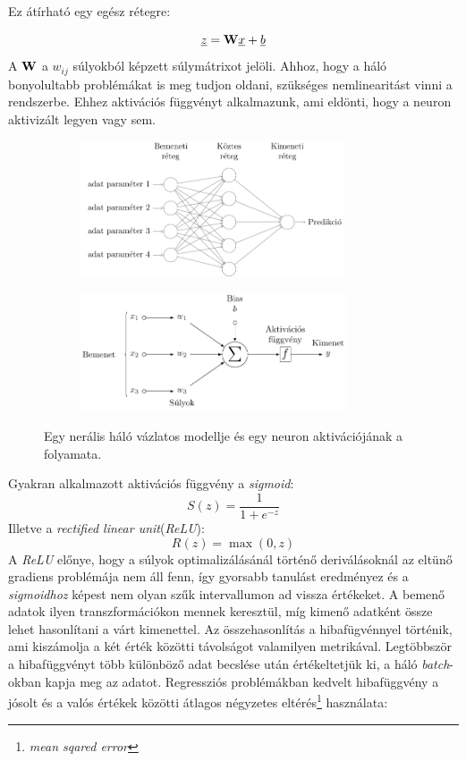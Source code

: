 \documentclass[12pt,letterpaper,oneside,openright]{book}
\begin{document}
Ez átírható egy egész rétegre:

\begin{equation}
\underline{z} = \bold{W}\underline x +\underline{b}
\end{equation}
A $\bold{W}$ a $w_{ij}$ súlyokból képzett súlymátrixot jelöli. Ahhoz, hogy a háló bonyolultabb problémákat is meg tudjon oldani, szükséges nemlinearitást vinni a rendszerbe. Ehhez  aktivációs függvényt alkalmazunk, ami eldönti, hogy a neuron aktivizált legyen vagy sem.  
\begin{figure}[h!]
\centering
\hspace{-2.8 cm}
\begin{subfigure}[b]{0.3\textwidth}
\includegraphics[height=40mm]{Figures/fig1.pdf}
\end{subfigure}\hspace{3.5 cm}
\begin{subfigure}[b]{0.3\textwidth}
\includegraphics[height=35mm]{figures/fig2.pdf}
\end{subfigure}
\caption[Neurális háló vázlatos modellje]{Egy nerális háló vázlatos modellje és egy neuron aktivációjának a folyamata.}

\end{figure}
Gyakran alkalmazott aktivációs függvény a \textit{sigmoid}:
\begin{equation}
S(z) = \frac{1}{1 + e^{-z}}
\end{equation}
Illetve a \textit{rectified linear unit}(\textit{ReLU}):
\begin{equation}
R(z) = \max{(0, z)}
\end{equation}
A \textit{ReLU} előnye, hogy a súlyok optimalizálásánál történő deriválásoknál az eltünő gradiens problémája nem áll fenn, így gyorsabb tanulást eredményez és a \textit{sigmoidhoz} képest nem olyan szűk intervallumon ad vissza értékeket. A bemenő adatok ilyen transzformációkon mennek keresztül, míg kimenő adatként össze lehet hasonlítani a várt kimenettel. Az összehasonlítás a hibafügvénnyel történik, ami kiszámolja a két érték közötti távolságot valamilyen metrikával. Legtöbbször a hibafüggvényt több különböző adat becslése után értékeltetjük ki, a háló \textit{batch}-okban kapja meg az adatot. Regressziós problémákban kedvelt hibafüggvény a jósolt és a valós értékek közötti átlagos négyzetes eltérés\footnote{\textit{mean sqared error}} használata:
\end{document}
